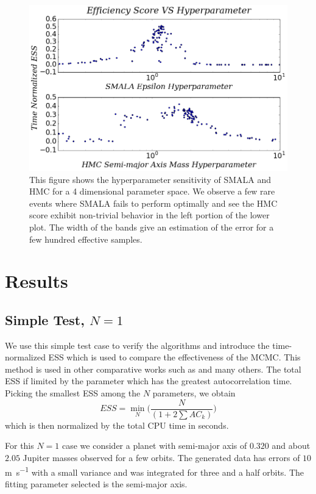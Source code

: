 \documentclass{aa}
\begin{document}
\begin{figure}
\centering
\includegraphics[width=0.95\hsize]{sensitivity-1.png}
   \caption{This figure shows the hyperparameter sensitivity of SMALA and HMC for a 4 dimensional parameter space. 
We observe a few rare events where SMALA fails to perform optimally and see the HMC score exhibit non-trivial behavior in the left portion of the lower plot. 
The width of the bands give an estimation of the error for a few hundred effective samples.}
      \label{sensfig}
\end{figure}

\section{Results}\label{results}
\subsection{Simple Test, $N=1$}
We use this simple test case to verify the algorithms and introduce the time-normalized ESS which is used to compare the effectiveness of the MCMC.
This method is used in other comparative works such as \cite{Girolami2011, 1504.01418, Meyer2016, Lan2015} and many others. 
The total ESS if limited by the parameter which has the greatest autocorrelation time. Picking the smallest ESS among the $N$ parameters, we obtain $$ESS = \min_N\bigg( \frac{N}{(1+2\sum AC_k)}\bigg)$$ which is then normalized by the total CPU time in seconds. 

For this $N=1$ case we consider a planet with semi-major axis of $0.320$ and about $2.05$ Jupiter masses observed for a few orbits.
The generated data has errors of $10$ \si{\metre\per\second} with a small variance and was integrated for three and a half orbits.
The fitting parameter selected is the semi-major axis.
\end{document}
